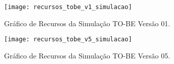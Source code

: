 \begin{figure}[H]
	\centering
	\texttt{[image: recursos\_tobe\_v1\_simulacao]}
	\caption[Gráfico de Recursos da Simulação TO-BE Versão 01]{Gráfico de Recursos da Simulação TO-BE Versão 01.}
	\label{fig:recursostobevum}
\end{figure}

\begin{figure}[H]
	\centering
	\texttt{[image: recursos\_tobe\_v5\_simulacao]}
	\caption[Gráfico de Recursos da Simulação TO-BE Versão 05]{Gráfico de Recursos da Simulação TO-BE Versão 05.}
	\label{fig:recursostobevcinco}
\end{figure}
